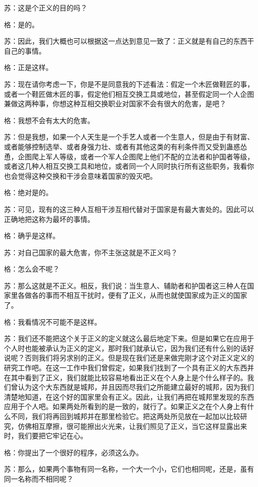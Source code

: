 \documentclass[12pt,oneside]{book}
\begin{document}
苏：这是个正义的目的吗？

格：是的。

苏：因此，我们大概也可以根据这一点达到意见一致了：正义就是有自己的东西干自己的事情。

格：正是这样。

苏：现在请你考虑一下，你是不是同意我的下述看法：假定一个木匠做鞋匠的事，或者一个鞋匠做木匠的事，假定他们相互交换工具或地位，甚至假定同一个人企图兼做这两种事，你想这种互相交换职业对国家不会有很大的危害，是吧？

格：我想不会有太大的危害。

苏：但是我想，如果一个人天生是一个手艺人或者一个生意人，但是由于有财富、或者能够控制选举、或者身强力壮、或者有其他这类的有利条件而又受到蛊惑怂恿，企图爬上军人等级，或者一个军人企图爬上他们不配的立法者和护国者等级，或者这几种人相互交换工具和地位，或者同一个人同时执行所有这些职务，我看你也会觉得这种交换和干涉会意味着国家的毁灭吧。

格：绝对是的。

苏：可见，现有的这三种人互相干涉互相代替对于国家是有最大害处的。因此可以正确地把这称为最坏的事情。

格：确乎是这样。

苏：对自己国家的最大危害，你不主张这就是不正义吗？

格：怎么会不呢？

苏：那么这就是不正义。相反，我们说：当生意人、辅助者和护国者这三种人在国家里各做各的事而不相互干扰时，便有了正义，从而也就使国家成为正义的国家了。

格：我看情况不可能不是这样。

苏：我们还不能把这个关于正义的定义就这么最后地定下来。但是如果它在应用于个人时也能被承认为正义的定义，那时我们就承认它，因为我们还有什么别的话好说呢？否则我们将另求别的正义。但是现在我们还是来做完刚才这个对正义定义的研究工作吧。在这一工作中我们曾假定，如果我们找到了一个具有正义的大东西并在其中看到了正义，我们就能比较容易地看出正义在个人身上是个什么样子的。我们曾认为这个大东西就是城邦，并且因而尽我们之所能建立最好的城邦，因为我们清楚地知道，在这个好的国家里会有正义。因此，让我们再把在城邦里发现的东西应用于个人吧。如果两处所看到的是一致的，就行了。如果正义之在个人身上有什么不同，我们将再回到城邦并在那里检验它。把这两处所见放在一起加以比较研究，仿佛相互摩擦，很可能擦出火光来，让我们照见了正义，当它这样显露出来时，我们要把它牢记在心。

格：你提出了一个很好的程序，必须这么办。

苏：那么，如果两个事物有同一名称，一个大一个小，它们也相同呢，还是，虽有同一名称而不相同呢？
\end{document}
